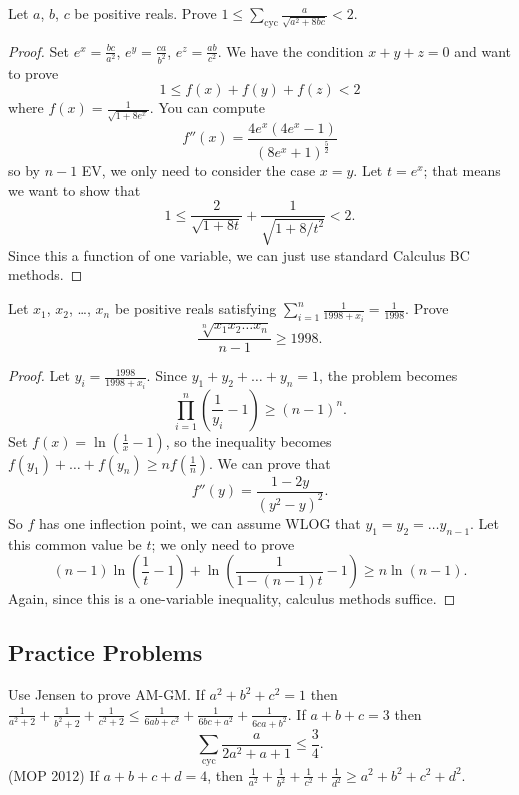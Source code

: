 \documentclass[11pt]{scrartcl}
\begin{document}
\begin{example}
	 Let $a$, $b$, $c$ be positive reals.
	Prove
	$ 1 \le \sum_{\text{cyc}} \frac{a}{\sqrt{a^2+8bc}} < 2 $.
\end{example}
\begin{proof}
	Set $e^x = \frac{bc}{a^2}$, $e^y = \frac{ca}{b^2}$, $e^z = \frac{ab}{c^2}$. We have the condition $x+y+z=0$ and want to prove
	\[ 1 \le f(x) + f(y) + f(z) < 2 \]
	where $f(x) = \frac{1}{\sqrt{1+8e^x}}$. You can compute
	\[ f''(x) = \frac{4e^x \left( 4e^x-1 \right)}{(8e^x+1)^{\frac52}} \]
	so by $n-1$ EV, we only need to consider the case $x=y$.
	Let $t=e^x$; that means we want to show that
	\[ 1 \le \frac{2}{\sqrt{1+8t}} + \frac{1}{\sqrt{1+8/t^2}} < 2. \]
	Since this a function of one variable, we can just use standard Calculus BC methods.
\end{proof}

\begin{example}
	[Vietnam 1998] Let $x_1$, $x_2$, \dots, $x_n$ be positive reals satisfying $\sum_{i=1}^n \frac{1}{1998+x_i} = \frac{1}{1998}$. Prove
	\[ \frac{\sqrt[n]{x_1x_2 \dots x_n}}{n-1} \ge 1998. \]
\end{example}
\begin{proof}
	Let $y_i = \frac{1998}{1998+x_i}$. Since $y_1 + y_2 + \dots + y_n = 1$, the problem becomes
	\[ \prod_{i=1}^n \left( \frac{1}{y_i} - 1 \right) \ge \left( n-1 \right)^n. \]
	Set $f(x) = \ln \left( \frac 1x-1 \right)$, so the inequality becomes $f(y_1) + \dots + f(y_n) \ge n f\left( \frac 1n \right)$.
	We can prove that
	\[ f''(y) = \frac{1-2y}{(y^2-y)^2}. \]
	So $f$ has one inflection point, we can assume WLOG that $y_1 = y_2 = \dots y_{n-1}$. Let this common value be $t$; we only need to prove
	\[ (n-1) \ln \left( \frac{1}{t}-1 \right) + \ln \left( \frac{1}{1-(n-1)t}-1 \right) \ge n \ln (n-1). \]
	Again, since this is a one-variable inequality,
	calculus methods suffice.
\end{proof}

\subsection{Practice Problems}
\begin{enumerate}
	\ii Use Jensen to prove AM-GM.
	\ii If $a^2+b^2+c^2=1$ then $\frac{1}{a^2+2}+\frac{1}{b^2+2}+\frac{1}{c^2+2}\le\frac{1}{6ab+c^2}+\frac{1}{6bc+a^2}+\frac{1}{6ca+b^2}$.
	\ii If $a+b+c=3$ then \[ \sum_{\text{cyc}} \frac{a}{2a^2+a+1} \le \frac 34. \]
	\ii (MOP 2012) If $a+b+c+d = 4$, then $\frac{1}{a^2}+\frac{1}{b^2}+\frac{1}{c^2}+\frac{1}{d^2}\ge a^2+b^2+c^2+d^2$.
\end{enumerate}
\end{document}
